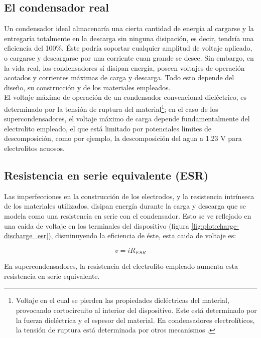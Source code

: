 \subsection{El condensador real}
Un condensador ideal almacenaría una cierta cantidad de energía al cargarse y la entregaría totalmente en la descarga sin ninguna disipación, es decir, tendría una eficiencia del 100\%. Éste podría soportar cualquier amplitud de voltaje aplicado, o cargarse y descargarse por una corriente cuan grande se desee.  Sin embargo, en la vida real, los condensadores sí disipan energía, poseen voltajes de operación acotados y corrientes máximas de carga y descarga. Todo esto depende del diseño, su construcción y de los materiales empleados.\\
El voltaje máximo de operación de un condensador convencional dieléctrico, es determinado por la tensión de ruptura del material\footnote{Voltaje en el cual se pierden las propiedades dieléctricas del material, provocando cortocircuito al interior del dispositivo. Este está determinado por la fuerza dieléctrica y el espesor del material. En condensadores electrolíticos, la tensión de ruptura está determinada por otros mecanismos \citep{Yahalom1971}.}; en el caso de los supercondensadores, el voltaje máximo de carga depende fundamentalmente del electrolito empleado, el que está limitado por potenciales límites de descomposición, como por ejemplo, la descomposición del agua a 1.23 V para electrolitos acuosos.\\

\subsection{Resistencia en serie equivalente (ESR)}
Las imperfecciones en la construcción de los electrodos, y la resistencia intrínseca de los materiales utilizados, disipan energía durante la carga y descarga que se modela como una resistencia en serie con el condensador. Esto se ve reflejado en una caída de voltaje en los terminales del dispositivo (figura \ref{fig:plot:charge-discharge_esr}), disminuyendo la eficiencia de éste, esta caida de voltaje es:

\begin{equation}
	v = iR_{ESR}
\end{equation}

En supercondensadores, la resistencia del electrolito empleado aumenta esta resistencia en serie equivalente.

